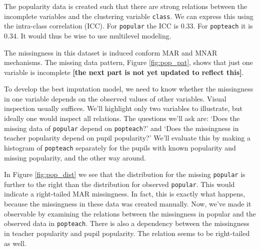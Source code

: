 \documentclass[
]{jss}
\begin{document}
The popularity data is created such that there are strong relations
between the incomplete variables and the clustering variable
\texttt{class}. We can express this using the intra-class correlation
(ICC). For \texttt{popular} the ICC is 0.33. For \texttt{popteach} it is
0.34. It would thus be wise to use multilevel modeling.

The missingness in this dataset is induced conform MAR and MNAR
mechanisms. The missing data pattern, Figure \ref{fig:pop_pat}, shows
that just one variable is incomplete \textbf{{[}the next part is not yet
updated to reflect this{]}}.

To develop the best imputation model, we need to know whether the
missingness in one variable depends on the observed values of other
variables. Visual inspection usually suffices. We'll highlight only two
variables to illustrate, but ideally one would inspect all relations.
The questions we'll ask are: `Does the missing data of \texttt{popular}
depend on \texttt{popteach}?' and `Does the missingness in teacher
popularity depend on pupil popularity?' We'll evaluate this by making a
histogram of \texttt{popteach} separately for the pupils with known
popularity and missing popularity, and the other way around.

In Figure \ref{fig:pop_dist} we see that the distribution for the
missing \texttt{popular} is further to the right than the distribution
for observed \texttt{popular}. This would indicate a right-tailed MAR
missingness. In fact, this is exactly what happens, because the
missingness in these data was created manually. Now, we've made it
observable by examining the relations between the missingness in popular
and the observed data in \texttt{popteach}. There is also a dependency
between the missingness in teacher popularity and pupil popularity. The
relation seems to be right-tailed as well.
\end{document}
